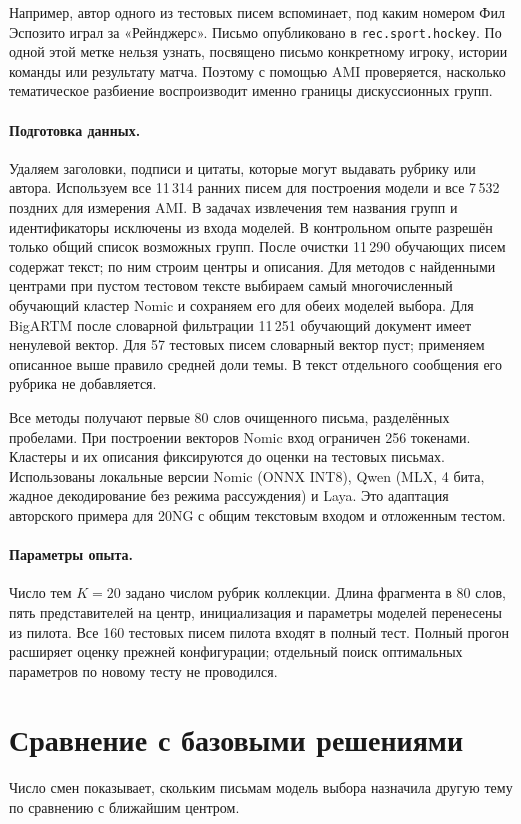 \documentclass[11pt,a4paper]{article}
\begin{document}
Например, автор одного из тестовых писем вспоминает, под каким номером Фил Эспозито играл за «Рейнджерс». Письмо опубликовано в \texttt{rec.sport.hockey}. По одной этой метке нельзя узнать, посвящено письмо конкретному игроку, истории команды или результату матча. Поэтому с помощью AMI проверяется, насколько тематическое разбиение воспроизводит именно границы дискуссионных групп.

\paragraph{Подготовка данных.} Удаляем заголовки, подписи и цитаты, которые могут выдавать рубрику или автора. Используем все 11\,314 ранних писем для построения модели и все 7\,532 поздних для измерения AMI. В задачах извлечения тем названия групп и идентификаторы исключены из входа моделей. В контрольном опыте разрешён только общий список возможных групп. После очистки 11\,290 обучающих писем содержат текст; по ним строим центры и описания. Для методов с найденными центрами при пустом тестовом тексте выбираем самый многочисленный обучающий кластер Nomic и сохраняем его для обеих моделей выбора. Для BigARTM после словарной фильтрации 11\,251 обучающий документ имеет ненулевой вектор. Для 57 тестовых писем словарный вектор пуст; применяем описанное выше правило средней доли темы. В текст отдельного сообщения его рубрика не добавляется.

Все методы получают первые 80 слов очищенного письма, разделённых пробелами. При построении векторов Nomic вход ограничен 256 токенами. Кластеры и их описания фиксируются до оценки на тестовых письмах. Использованы локальные версии Nomic (ONNX INT8), Qwen (MLX, 4 бита, жадное декодирование без режима рассуждения) и Laya. Это адаптация авторского примера для 20NG с общим текстовым входом и отложенным тестом.

\paragraph{Параметры опыта.} Число тем $K=20$ задано числом рубрик коллекции. Длина фрагмента в 80 слов, пять представителей на центр, инициализация и параметры моделей перенесены из пилота. Все 160 тестовых писем пилота входят в полный тест. Полный прогон расширяет оценку прежней конфигурации; отдельный поиск оптимальных параметров по новому тесту не проводился.

\section{Сравнение с базовыми решениями}
\begin{center}\end{center}
Число смен показывает, скольким письмам модель выбора назначила другую тему по сравнению с ближайшим центром. 
\end{document}
